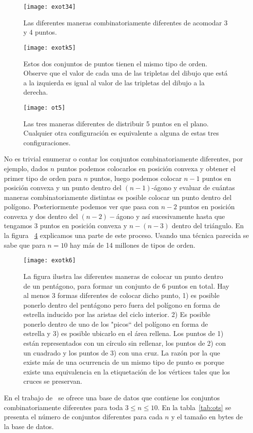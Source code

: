 \begin{figure}[htpb]
  \centering
  \texttt{[image: exot34]}
  \caption{Las diferentes maneras combinatoriamente diferentes
  de acomodar 3 y 4 puntos.}
  \label{fig:exotk34}
\end{figure}
\begin{figure}[htpb]
  \centering
  \texttt{[image: exotk5]}
  \caption{Estos dos conjuntos de puntos tienen el mismo tipo de orden.
  Observe que el valor de cada una de las tripletas del dibujo
  que está a la izquierda es igual al valor de las tripletas del
  dibujo a la derecha.}
  \label{fig:exotk5}
\end{figure}
\begin{figure}[htpb]
  \centering
  \texttt{[image: ot5]}
  \caption{Las tres maneras diferentes de distribuir 5 puntos en el plano.
  Cualquier otra configuración es equivalente a alguna de estas tres
  configuraciones.}
  \label{fig:ot5}
\end{figure}

No es trivial enumerar o contar los conjuntos combinatoriamente diferentes, por
ejemplo, dados $n$ puntos podemos colocarlos en posición convexa y obtener el
primer tipo de orden para $n$ puntos, luego podemos colocar $n-1$ puntos en
posición convexa y un punto dentro del $(n-1)$-ágono y evaluar de cuántas
maneras combinatoriamente distintas es posible colocar un punto dentro del
polígono. Posteriormente podemos ver que pasa con $n-2$ puntos en posición
convexa y dos dentro del $(n-2)-$ágono y así sucesivamente hasta que tengamos 3
puntos en posición convexa y $n-(n-3)$ dentro del triángulo. En la figura
~\ref{fig:exotk6} explicamos una parte de este proceso. Usando una técnica
parecida se sabe que para $n=10$ hay más de 14 millones de tipos de orden.
\begin{figure}[htpb]
  \centering
  \texttt{[image: exotk6]}
  \caption{La figura ilustra las diferentes maneras de colocar un punto
  dentro de un pentágono, para formar un conjunto de 6 puntos en total.
  Hay al menos 3 formas diferentes de colocar dicho punto, 1) es posible
  ponerlo dentro del pentágono pero fuera del polígono en forma de estrella
  inducido por las aristas del ciclo interior. 2) Es posible ponerlo
  dentro de uno de los "picos`` del polígono en forma de estrella y 3)
  es posible ubicarlo en el área rellena. Los puntos de 1) están
  representados con un círculo sin rellenar, los puntos de 2) con un cuadrado
  y los puntos de 3) con una cruz. La razón por la que existe más de una
  ocurrencia de un mismo tipo de punto es porque existe una equivalencia en la
  etiquetación de los vértices tales que los cruces se preservan.}
  \label{fig:exotk6}
\end{figure}
En el trabajo de~\cite{Aichholzer2002} se ofrece una base de datos que contiene
los conjuntos combinatoriamente diferentes para toda $3\leq n\leq 10$. En la
tabla~\ref{tab:ots} se presenta el número de conjuntos diferentes para cada $n$
y el tamaño en bytes de la base de datos.


